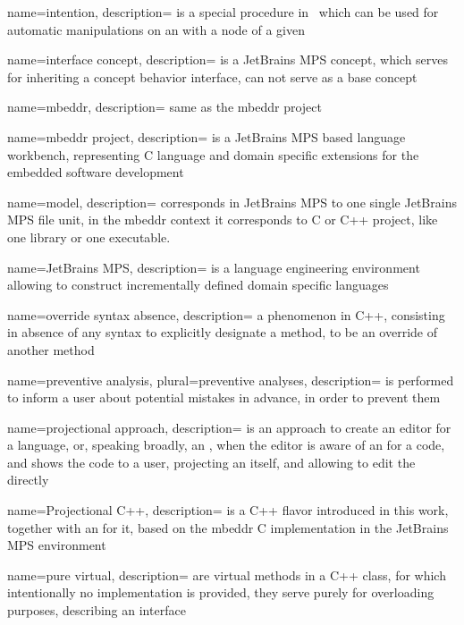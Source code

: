 {
  name=intention,
  description={ is a special procedure in \jbmps\ which can be used for automatic manipulations on an  with a 
  node of a given }
}

{
  name=interface concept,
  description={ is a JetBrains MPS concept, which serves for inheriting a concept behavior interface, can not serve as a base concept}
}


{
  name=mbeddr,
  description={ same as the mbeddr project}
}


{
  name=mbeddr project,
  description={ is a JetBrains MPS based language workbench, representing C language and domain specific
  extensions for the embedded software development}
}

{
  name=model,
  description={ corresponds in JetBrains MPS to one single JetBrains MPS file unit, in the mbeddr context it corresponds 
  to C or C++ project, like one library or one executable.}
}

{
  name=JetBrains MPS,
  description={ is a language engineering environment 
  allowing to construct incrementally defined domain specific languages}
}

{
  name=override syntax absence,
  description={ a phenomenon in C++, consisting in absence of any syntax to explicitly designate a method, to be an override
  of another method}
}


{
  name=preventive analysis,
  plural=preventive analyses,
  description={ is performed to inform a user about  potential mistakes in advance, in order to prevent them}
}

{
  name=projectional approach,
  description={ is an approach to create an editor for a language, or, speaking broadly, an , when the editor is 
  aware of an  for a code, and shows the code to a user, projecting an 
   itself, and allowing to edit the  directly}
}

{
  name=Projectional C++,
  description={ is a C++ flavor introduced in this work, together with an  for it, based on the mbeddr C implementation in the JetBrains MPS environment}
}

{
  name=pure virtual,
  description={ are virtual methods in a C++ class, for which intentionally no implementation is provided, they serve purely for overloading purposes, 
  describing an interface}
}


